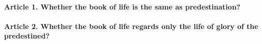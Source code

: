 \documentclass{ucetd}
\begin{document}
\paragraph{Article 1. Whether the book of life is the same as predestination?}
\paragraph{Article 2. Whether the book of life regards only the life of glory of the predestined?}
\end{document}
